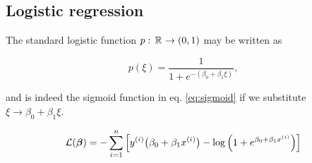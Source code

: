 \subsection{Logistic regression}\label{sec:logistic_regression}

The standard logistic function $p:\, \mathbb{R}^{} \to (0,1)$ may be written as 

\begin{equation}\label{eq:logistic_function}
    p(\xi) = \frac{1}{1+e^{-(\beta_0 + \beta_1\xi)}},
\end{equation}

and is indeed the sigmoid function in eq. \eqref{eq:sigmoid} if we substitute $\xi \to \beta_0 + \beta_1 \xi$.


\begin{equation}\label{eq:logistic_cost_function}
    \mathcal{L}(\boldsymbol{\beta}) = - \sum_{i=1}^n \Big[ y^{(i)} \big(\beta_0+ \beta_1 x^{(i)}\big) - \log{\Big(1+e^{\beta_0 + \beta_1 x^{(i)}}\Big)} \Big]
\end{equation}